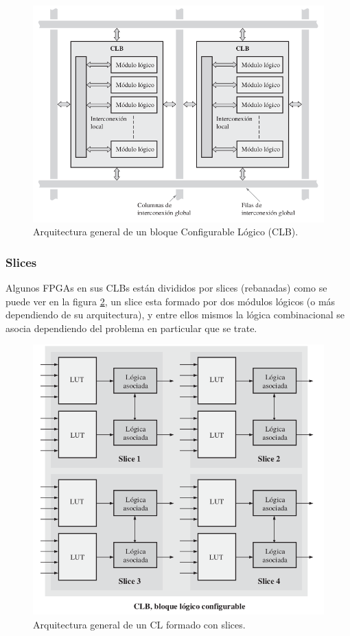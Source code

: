 \documentclass[twoside,spanish,ESP,MSc]{plantillaLabUPV}
\theoremstyle{definition}
\newcommand{\fs}{FPGAs }
\begin{document}
\begin{figure}[h]
\centering
\includegraphics[scale=0.325]{ima/clbf.png}
\caption{Arquitectura general de un bloque Configurable Lógico (CLB).%
\label{arqclb}}
\end{figure}

\subsubsection*{Slices}

Algunos \fs en sus CLBs están divididos por slices (rebanadas) como se puede ver en la figura \ref{slice}, un slice esta formado por dos módulos lógicos (o más dependiendo de su arquitectura), y entre ellos mismos la lógica combinacional se asocia dependiendo del problema en particular que se trate.\\

\begin{figure}[!h]
\centering
\includegraphics[scale=0.275]{ima/slice.png}
\caption{Arquitectura general de un CL formado con slices.%
\label{slice}}
\end{figure}
\end{document}
